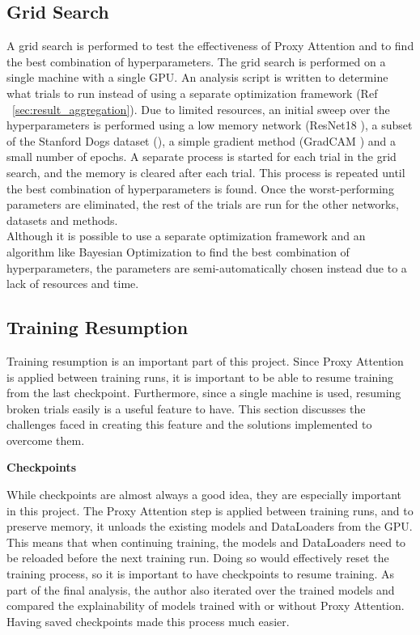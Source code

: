 \documentclass[a4paper,11pt,openright]{book}
\begin{document}
\subsection{Grid Search}
A grid search is performed to test the effectiveness of Proxy Attention and to find the best combination of hyperparameters. The grid search is performed on a single machine with a single GPU. An analysis script is written to determine what trials to run instead of using a separate optimization framework (Ref ~\ref{sec:result_aggregation}).
Due to limited resources, an initial sweep over the hyperparameters is performed using a low memory network (ResNet18 \cite{heDeepResidualLearning2016}), a subset of the Stanford Dogs dataset (\cite{khoslaNovelDatasetFineGrained}), a simple gradient method (GradCAM \cite{selvarajuGradCAMVisualExplanations}) and a small number of epochs. A separate process is started for each trial in the grid search, and the memory is cleared after each trial. This process is repeated until the best combination of hyperparameters is found. Once the worst-performing parameters are eliminated, the rest of the trials are run for the other networks, datasets and methods.\\
Although it is possible to use a separate optimization framework and an algorithm like Bayesian Optimization to find the best combination of hyperparameters, the parameters are semi-automatically chosen instead due to a lack of resources and time.

\subsection{Training Resumption}
Training resumption is an important part of this project. Since Proxy Attention is applied between training runs, it is important to be able to resume training from the last checkpoint. Furthermore, since a single machine is used, resuming broken trials easily is a useful feature to have. This section discusses the challenges faced in creating this feature and the solutions implemented to overcome them.

\textbf{Checkpoints} \label{sec:checkpoints}

While checkpoints are almost always a good idea, they are especially important in this project. The Proxy Attention step is applied between training runs, and to preserve memory, it unloads the existing models and DataLoaders from the GPU. This means that when continuing training, the models and DataLoaders need to be reloaded before the next training run. Doing so would effectively reset the training process, so it is important to have checkpoints to resume training.
As part of the final analysis, the author also iterated over the trained models and compared the explainability of models trained with or without Proxy Attention. Having saved checkpoints made this process much easier.
\end{document}
